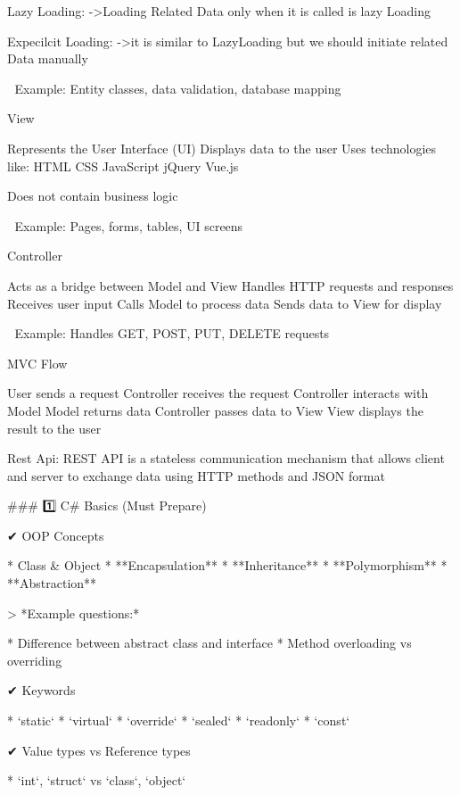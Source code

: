 Lazy Loading:
            ->Loading Related Data only when it is called is lazy Loading

Expecilcit Loading:
            ->it is similar to LazyLoading but we should initiate related Data manually

📌 Example: Entity classes, data validation, database mapping

View

            Represents the User Interface (UI)
            Displays data to the user
            Uses technologies like:
            HTML
            CSS
            JavaScript
            jQuery
            Vue.js

Does not contain business logic

📌 Example: Pages, forms, tables, UI screens

Controller

                Acts as a bridge between Model and View
                Handles HTTP requests and responses
                Receives user input
                Calls Model to process data
                Sends data to View for display

📌 Example: Handles GET, POST, PUT, DELETE requests

MVC Flow

            User sends a request
            Controller receives the request
            Controller interacts with Model
            Model returns data
            Controller passes data to View
            View displays the result to the user

Rest Api:
REST API is a stateless communication mechanism that allows client and server to exchange data using HTTP methods and JSON format





### 1️⃣ C# Basics (Must Prepare)

✔ OOP Concepts

* Class & Object
* **Encapsulation**
* **Inheritance**
* **Polymorphism**
* **Abstraction**

> *Example questions:*

* Difference between abstract class and interface
* Method overloading vs overriding

✔ Keywords

* `static`
* `virtual`
* `override`
* `sealed`
* `readonly`
* `const`

✔ Value types vs Reference types

* `int`, `struct` vs `class`, `object`

